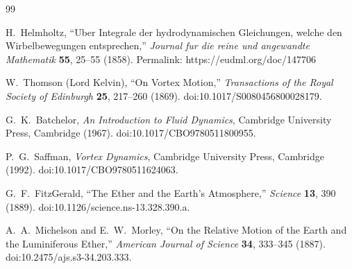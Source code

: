 \begin{thebibliography}{99}

H.~Helmholtz,
``Uber Integrale der hydrodynamischen Gleichungen, welche den Wirbelbewegungen entsprechen,''
\textit{Journal fur die reine und angewandte Mathematik} \textbf{55}, 25--55 (1858).
Permalink: https://eudml.org/doc/147706

W.~Thomson (Lord Kelvin),
``On Vortex Motion,''
\textit{Transactions of the Royal Society of Edinburgh} \textbf{25}, 217--260 (1869).
doi:10.1017/S0080456800028179.

G.~K.~Batchelor,
\textit{An Introduction to Fluid Dynamics},
Cambridge University Press, Cambridge (1967).
doi:10.1017/CBO9780511800955.

P.~G.~Saffman,
\textit{Vortex Dynamics},
Cambridge University Press, Cambridge (1992).
doi:10.1017/CBO9780511624063.

G.~F.~FitzGerald,
``The Ether and the Earth's Atmosphere,''
\textit{Science} \textbf{13}, 390 (1889).
doi:10.1126/science.ns-13.328.390.a.

A.~A.~Michelson and E.~W.~Morley,
``On the Relative Motion of the Earth and the Luminiferous Ether,''
\textit{American Journal of Science} \textbf{34}, 333--345 (1887).
doi:10.2475/ajs.s3-34.203.333.

\end{thebibliography}
